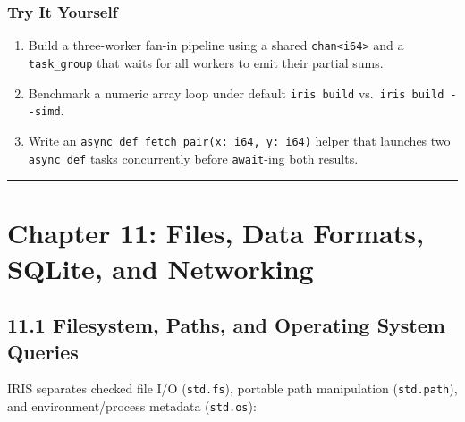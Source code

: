 \documentclass[
  english,
  oneside]{book}
\providecommand{\tightlist}{%
  \setlength{\itemsep}{0pt}\setlength{\parskip}{0pt}}
\begin{document}
\subsection{Try It Yourself}\label{try-it-yourself-9}

\begin{enumerate}
\def\labelenumi{\arabic{enumi}.}
\tightlist
\item
  Build a three-worker fan-in pipeline using a shared
  \texttt{chan\textless{}i64\textgreater{}} and a \texttt{task\_group}
  that waits for all workers to emit their partial sums.
\item
  Benchmark a numeric array loop under default \texttt{iris\ build}
  vs.~\texttt{iris\ build\ -\/-simd}.
\item
  Write an \texttt{async\ def\ fetch\_pair(x:\ i64,\ y:\ i64)} helper
  that launches two \texttt{async\ def} tasks concurrently before
  \texttt{await}-ing both results.
\end{enumerate}

\begin{center}\rule{0.5\linewidth}{0.5pt}\end{center}

\chapter{Chapter 11: Files, Data Formats, SQLite, and
Networking}\label{chapter-11-files-data-formats-sqlite-and-networking}

\section{11.1 Filesystem, Paths, and Operating System
Queries}\label{filesystem-paths-and-operating-system-queries}

IRIS separates checked file I/O (\texttt{std.fs}), portable path
manipulation (\texttt{std.path}), and environment/process metadata
(\texttt{std.os}):
\end{document}
